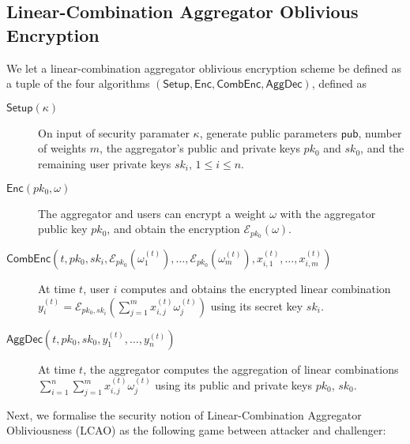 \documentclass[twocolumn]{autart}
\begin{document}
% 
% 

\subsection{Linear-Combination Aggregator Oblivious Encryption} \label{subsec:lcao}
We let a linear-combination aggregator oblivious encryption scheme be defined as a tuple of the four algorithms $(\mathsf{Setup}, \mathsf{Enc}, \mathsf{CombEnc}, \mathsf{AggDec})$, defined as

\begin{description}
    \item[$\mathsf{Setup}(\kappa)$] On input of security paramater $\kappa$, generate public parameters $\mathsf{pub}$, number of weights $m$, the aggregator's public and private keys $pk_0$ and $sk_0$, and the remaining user private keys $sk_i,\,1\leq i \leq n$.
    \item[$\mathsf{Enc}(pk_0, \omega)$] The aggregator and users can encrypt a weight $\omega$ with the aggregator public key $pk_0$, and obtain the encryption $\mathcal{E}_{pk_0}(\omega)$.
    \item[$\mathsf{CombEnc}(t, pk_0, sk_i, \mathcal{E}_{pk_0}(\omega_1^{(t)}),\dots,\mathcal{E}_{pk_0}(\omega_m^{(t)}), x^{(t)}_{i,1},\dots,x^{(t)}_{i,m})$] At time $t$, user $i$ computes and obtains the encrypted linear combination $y^{(t)}_i = \mathcal{E}_{pk_0,sk_i}(\sum^m_{j=1}x^{(t)}_{i,j}\omega^{(t)}_j)$ using its secret key $sk_i$.
    \item[$\mathsf{AggDec}(t, pk_0, sk_0, y^{(t)}_1,\dots,y^{(t)}_n)$] At time $t$, the aggregator computes the aggregation of linear combinations $\sum^{n}_{i=1}\sum^{m}_{j=1} x^{(t)}_{i,j}\omega^{(t)}_j$ using its public and private keys $pk_0$, $sk_0$.
\end{description}

Next, we formalise the security notion of Linear-Combination Aggregator Obliviousness (LCAO) as the following game between attacker and challenger:
\end{document}

